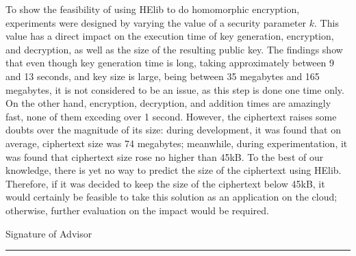 To show the feasibility of using HElib to do homomorphic encryption, experiments were designed by varying the value of a security parameter $k$. This value has a direct impact on the execution time of key generation, encryption, and decryption, as well as the size of the resulting public key. The findings show that even though key generation time is long, taking approximately between 9 and 13 seconds, and key size is large, being between 35 megabytes and 165 megabytes, it is not considered to be an issue, as this step is done one time only. On the other hand, encryption, decryption, and addition times are amazingly fast, none of them exceding over 1 second. However, the ciphertext raises some doubts over the magnitude of its size: during development, it was found that on average, ciphertext size was 74 megabytes; meanwhile, during experimentation, it was found that ciphertext size rose no higher than 45kB. To the best of our knowledge, there is yet no way to predict the size of the ciphertext using HElib. Therefore, if it was decided to keep the size of the ciphertext below 45kB, it would certainly be feasible to take this solution as an application on the cloud; otherwise, further evaluation on the impact would be required.

\noindent Signature of Advisor \rule{72mm}{0.3pt}

\vspace*{-4mm}

\noindent \phantom{Advisor signature: m} \asesor
